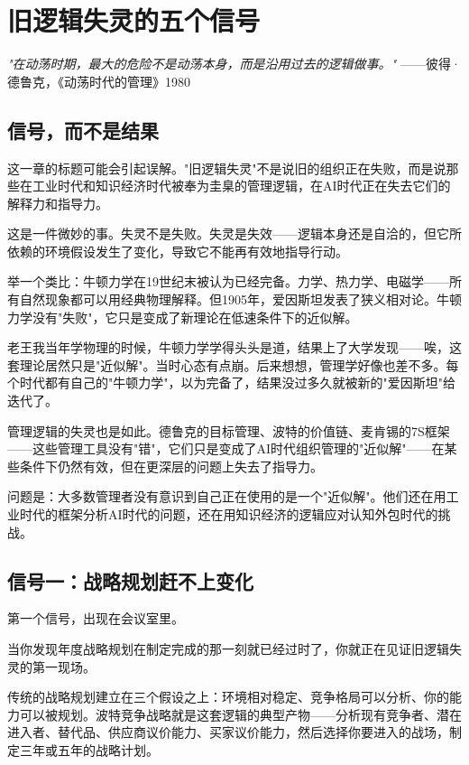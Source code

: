 \chapter{旧逻辑失灵的五个信号}


\textit{"在动荡时期，最大的危险不是动荡本身，而是沿用过去的逻辑做事。"}
——彼得·德鲁克，《动荡时代的管理》1980


\section{信号，而不是结果}


这一章的标题可能会引起误解。"旧逻辑失灵"不是说旧的组织正在失败，而是说那些在工业时代和知识经济时代被奉为圭臬的管理逻辑，在AI时代正在失去它们的解释力和指导力。

这是一件微妙的事。失灵不是失败。失灵是失效——逻辑本身还是自洽的，但它所依赖的环境假设发生了变化，导致它不能再有效地指导行动。

举一个类比：牛顿力学在19世纪末被认为已经完备。力学、热力学、电磁学——所有自然现象都可以用经典物理解释。但1905年，爱因斯坦发表了狭义相对论。牛顿力学没有"失败"，它只是变成了新理论在低速条件下的近似解。

老王我当年学物理的时候，牛顿力学学得头头是道，结果上了大学发现——唉，这套理论居然只是"近似解"。当时心态有点崩。后来想想，管理学好像也差不多。每个时代都有自己的"牛顿力学"，以为完备了，结果没过多久就被新的"爱因斯坦"给迭代了。

管理逻辑的失灵也是如此。德鲁克的目标管理、波特的价值链、麦肯锡的7S框架——这些管理工具没有"错"，它们只是变成了AI时代组织管理的"近似解"——在某些条件下仍然有效，但在更深层的问题上失去了指导力。

问题是：大多数管理者没有意识到自己正在使用的是一个"近似解"。他们还在用工业时代的框架分析AI时代的问题，还在用知识经济的逻辑应对认知外包时代的挑战。


\section{信号一：战略规划赶不上变化}


第一个信号，出现在会议室里。

当你发现年度战略规划在制定完成的那一刻就已经过时了，你就正在见证旧逻辑失灵的第一现场。

传统的战略规划建立在三个假设之上：环境相对稳定、竞争格局可以分析、你的能力可以被规划。波特竞争战略就是这套逻辑的典型产物——分析现有竞争者、潜在进入者、替代品、供应商议价能力、买家议价能力，然后选择你要进入的战场，制定三年或五年的战略计划。

